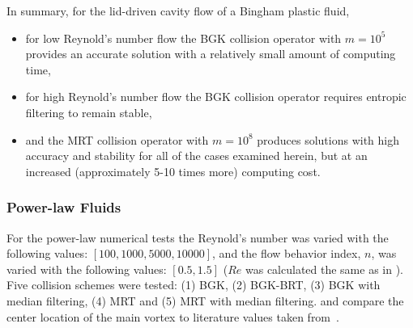 In summary, for the lid-driven cavity flow of a Bingham plastic fluid, 
\begin{itemize}
    \item for low Reynold's number flow the BGK collision operator with $m = 10^5$ provides an accurate solution with a relatively small amount of computing time,
    \item for high Reynold's number flow the BGK collision operator requires entropic filtering to remain stable,
    \item and the MRT collision operator with $m = 10^8$ produces solutions with high accuracy and stability for all of the cases examined herein, but at an increased (approximately 5-10 times more) computing cost.
\end{itemize} 

\subsubsection{Power-law Fluids}

For the power-law numerical tests the Reynold's number was varied with the following values: $[100, 1000, 5000, 10000]$, and the flow behavior index, $n$, was varied with the following values: $[0.5, 1.5]$ ($Re$ was calculated the same as in ).
Five collision schemes were tested: (1) BGK, (2) BGK-BRT, (3) BGK with median filtering, (4) MRT and (5) MRT with median filtering.
 and  compare the center location of the main vortex to literature values taken from~\citet{li2014simulation}.

